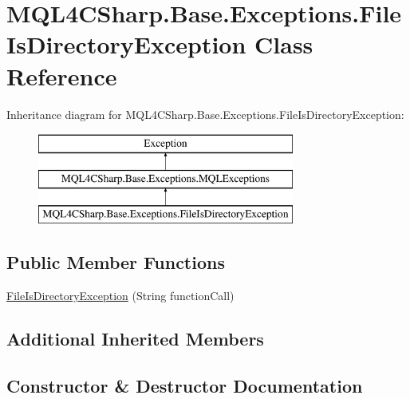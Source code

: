 \hypertarget{class_m_q_l4_c_sharp_1_1_base_1_1_exceptions_1_1_file_is_directory_exception}{}\section{M\+Q\+L4\+C\+Sharp.\+Base.\+Exceptions.\+File\+Is\+Directory\+Exception Class Reference}
\label{class_m_q_l4_c_sharp_1_1_base_1_1_exceptions_1_1_file_is_directory_exception}
Inheritance diagram for M\+Q\+L4\+C\+Sharp.\+Base.\+Exceptions.\+File\+Is\+Directory\+Exception\+:\begin{figure}[H]
\begin{center}
\leavevmode
\includegraphics[height=3.000000cm]{class_m_q_l4_c_sharp_1_1_base_1_1_exceptions_1_1_file_is_directory_exception}
\end{center}
\end{figure}
\subsection*{Public Member Functions}
\begin{DoxyCompactItemize}
\item 
\hyperlink{class_m_q_l4_c_sharp_1_1_base_1_1_exceptions_1_1_file_is_directory_exception_ad3dd5a5eca8e50ad9cdcd52987b78388}{File\+Is\+Directory\+Exception} (String function\+Call)
\end{DoxyCompactItemize}
\subsection*{Additional Inherited Members}


\subsection{Constructor \& Destructor Documentation}
